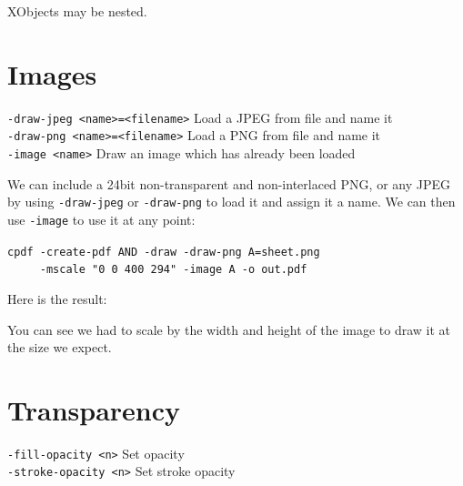 \documentclass{book}
\begin{document}
\noindent XObjects may be nested.

\section{Images}
  {\small\begin{framed}
   \noindent\verb!-draw-jpeg <name>=<filename>! Load a JPEG from file and name it\\
   \noindent\verb!-draw-png <name>=<filename>! Load a PNG from file and name it\\
   \noindent\verb!-image <name>! Draw an image which has already been loaded
  \end{framed}}

We can include a 24bit non-transparent and non-interlaced PNG, or any JPEG by using \texttt{-draw-jpeg} or \texttt{-draw-png} to load it and assign it a name. We can then use \texttt{-image} to use it at any point:

\begin{framed}
 \noindent\small\verb?cpdf -create-pdf AND -draw -draw-png A=sheet.png?\\
 \noindent\small\verb?     -mscale "0 0 400 294" -image A -o out.pdf?
\end{framed}

\noindent Here is the result:

\bigskip
{}
\bigskip

\noindent You can see we had to scale by the width and height of the image to draw it at the size we expect.

\section{Transparency}
  {\small\begin{framed}
   \noindent\verb!-fill-opacity <n>! Set opacity\\
   \noindent\verb!-stroke-opacity <n>! Set stroke opacity
  \end{framed}}
\end{document}
